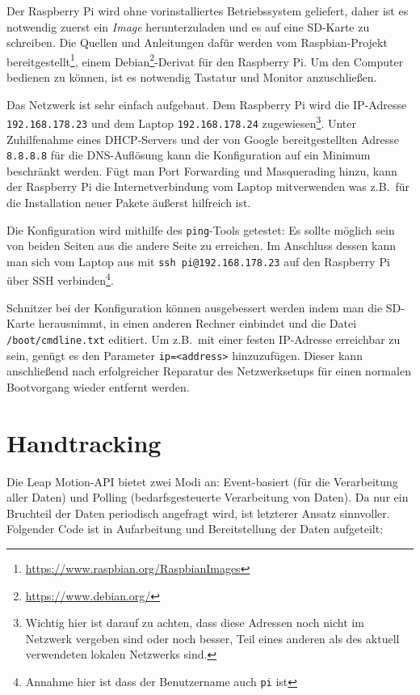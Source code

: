 \documentclass[a4paper, fontsize=12pt, toc=bibliographynumbered]{scrreprt}
\newcommand{\mono}[1]{\texttt{#1}}
\begin{document}
Der Raspberry Pi wird ohne vorinstalliertes Betriebssystem geliefert,
daher ist es notwendig zuerst ein \emph{Image} herunterzuladen und es
auf eine SD-Karte zu schreiben.  Die Quellen und Anleitungen dafür
werden vom Raspbian-Projekt
bereitgestellt\footnote{\url{https://www.raspbian.org/RaspbianImages}},
einem Debian\footnote{\url{https://www.debian.org/}}-Derivat für den
Raspberry Pi.  Um den Computer bedienen zu können, ist es notwendig
Tastatur und Monitor anzuschließen.

Das Netzwerk ist sehr einfach aufgebaut.  Dem Raspberry Pi wird die
IP-Adresse \mono{192.168.178.23} und dem Laptop \mono{192.168.178.24}
zugewiesen\footnote{Wichtig hier ist darauf zu achten, dass diese
  Adressen noch nicht im Netzwerk vergeben sind oder noch besser, Teil
  eines anderen als des aktuell verwendeten lokalen Netzwerks sind.}.
Unter Zuhilfenahme eines \ac{DHCP}-Servers und der von Google
bereitgestellten Adresse \mono{8.8.8.8} für die \ac{DNS}-Auflösung
kann die Konfiguration auf ein Minimum beschränkt werden.  Fügt man
Port Forwarding und Masquerading hinzu, kann der Raspberry Pi die
Internetverbindung vom Laptop mitverwenden was z.B.~für die
Installation neuer Pakete äußerst hilfreich ist.

Die Konfiguration wird mithilfe des \mono{ping}-Tools
getestet: Es sollte möglich sein von beiden Seiten aus die andere
Seite zu erreichen.  Im Anschluss dessen kann man sich vom Laptop aus
mit \mono{ssh pi@192.168.178.23} auf den Raspberry Pi über \ac{SSH}
verbinden\footnote{Annahme hier ist dass der Benutzername auch
  \mono{pi} ist}.

Schnitzer bei der Konfiguration können ausgebessert werden indem man
die SD-Karte herausnimmt, in einen anderen Rechner einbindet und die
Datei \mono{/boot/cmdline.txt} editiert.  Um z.B.~mit einer festen
IP-Adresse erreichbar zu sein, genügt es den Parameter
\mono{ip=<address>} hinzuzufügen.  Dieser kann anschließend nach
erfolgreicher Reparatur des Netzwerksetups für einen normalen
Bootvorgang wieder entfernt werden.

\section{Handtracking}

Die Leap Motion-API bietet zwei Modi an: Event-basiert (für die
Verarbeitung aller Daten) und Polling (bedarfsgesteuerte Verarbeitung
von Daten).  Da nur ein Bruchteil der Daten periodisch angefragt wird,
ist letzterer Ansatz sinnvoller.  Folgender Code ist in Aufarbeitung
und Bereitstellung der Daten aufgeteilt:
\end{document}
